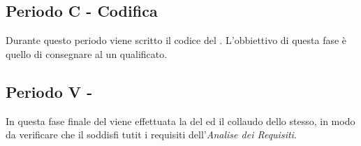 \documentclass[./PianoDiProgetto.tex]{subfiles}
\begin{document}
  \subsection{Periodo C - Codifica}

  Durante questo periodo viene scritto il codice del . L'obbiettivo
  di questa fase è quello di consegnare al  un  qualificato.

  \subsection{Periodo V - }

  In questa fase finale del  viene effettuata la  del  ed il
  collaudo dello stesso, in modo da verificare che il  soddisfi tutit i requisiti
  dell'\textit{Analise dei Requisiti}. 
\end{document}
